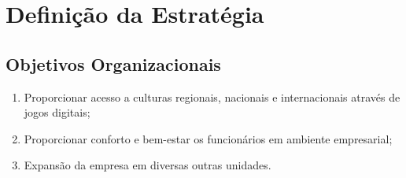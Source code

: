 \documentclass{abnt}
\begin{document}
		
	\chapter {Definição da Estratégia}
		\section{Objetivos Organizacionais}
		
		\begin{enumerate}
			\item Proporcionar acesso a culturas regionais, nacionais e internacionais através de jogos digitais;
			\item Proporcionar conforto e bem-estar os funcionários em ambiente empresarial;
			\item Expansão da empresa em diversas outras unidades.
		\end{enumerate}
\end{document}
